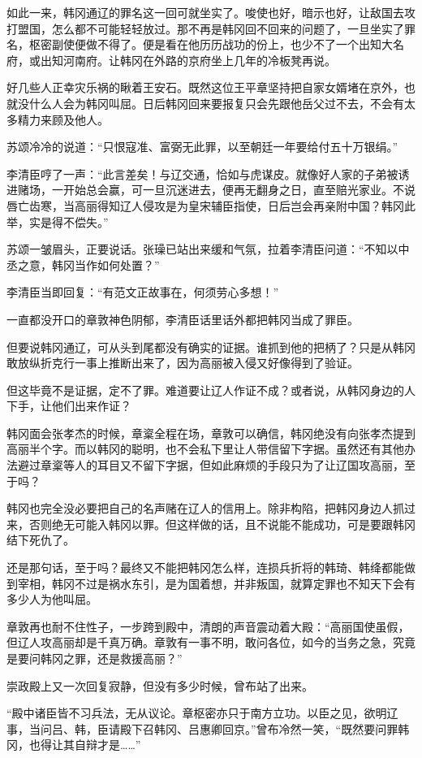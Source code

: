 如此一来，韩冈通辽的罪名这一回可就坐实了。唆使也好，暗示也好，让敌国去攻打盟国，怎么都不可能轻轻放过。那不再是韩冈回不回来的问题了，一旦坐实了罪名，枢密副使便做不得了。便是看在他历历战功的份上，也少不了一个出知大名府，或出知河南府。让韩冈在外路的京府坐上几年的冷板凳再说。

好几些人正幸灾乐祸的瞅着王安石。既然这位王平章坚持把自家女婿堵在京外，也就没什么人会为韩冈叫屈。日后韩冈回来要报复只会先跟他岳父过不去，不会有太多精力来顾及他人。

苏颂冷冷的说道：“只恨寇准、富弼无此罪，以至朝廷一年要给付五十万银绢。”

李清臣哼了一声：“此言差矣！与辽交通，恰如与虎谋皮。就像好人家的子弟被诱进赌场，一开始总会赢，可一旦沉迷进去，便再无翻身之日，直至赔光家业。不说唇亡齿寒，当高丽得知辽人侵攻是为皇宋辅臣指使，日后岂会再亲附中国？韩冈此举，实是得不偿失。”

苏颂一皱眉头，正要说话。张璪已站出来缓和气氛，拉着李清臣问道：“不知以中丞之意，韩冈当作如何处置？”

李清臣当即回复：“有范文正故事在，何须劳心多想！”

一直都没开口的章敦神色阴郁，李清臣话里话外都把韩冈当成了罪臣。

但要说韩冈通辽，可从头到尾都没有确实的证据。谁抓到他的把柄了？只是从韩冈敢放纵折克行一事上推断出来了，因为高丽被入侵又好像得到了验证。

但这毕竟不是证据，定不了罪。难道要让辽人作证不成？或者说，从韩冈身边的人下手，让他们出来作证？

韩冈面会张孝杰的时候，章楶全程在场，章敦可以确信，韩冈绝没有向张孝杰提到高丽半个字。而以韩冈的聪明，也不会私下里让人带信留下字据。虽然还有其他办法避过章楶等人的耳目又不留下字据，但如此麻烦的手段只为了让辽国攻高丽，至于吗？

韩冈也完全没必要把自己的名声赌在辽人的信用上。除非构陷，把韩冈身边人抓过来，否则绝无可能入韩冈以罪。但这样做的话，且不说能不能成功，可是要跟韩冈结下死仇了。

还是那句话，至于吗？最终又不能把韩冈怎么样，连损兵折将的韩琦、韩绛都能做到宰相，韩冈不过是祸水东引，是为国着想，并非叛国，就算定罪也不知天下会有多少人为他叫屈。

章敦再也耐不住性子，一步跨到殿中，清朗的声音震动着大殿：“高丽国使虽假，但辽人攻高丽却是千真万确。章敦有一事不明，敢问各位，如今的当务之急，究竟是要问韩冈之罪，还是救援高丽？”

崇政殿上又一次回复寂静，但没有多少时候，曾布站了出来。

“殿中诸臣皆不习兵法，无从议论。章枢密亦只于南方立功。以臣之见，欲明辽事，当问吕、韩，臣请殿下召韩冈、吕惠卿回京。”曾布冷然一笑，“既然要问罪韩冈，也得让其自辩才是……”
